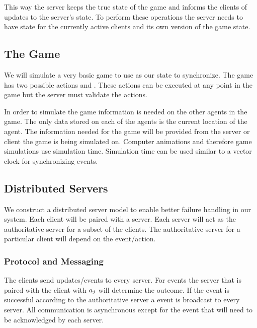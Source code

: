 	This way the server keeps the true state of the game and informs the clients of updates to the server's state. To perform these operations the server needs to have state for the currently active clients and its own version of the game state.

\subsection{The Game}

	We will simulate a very basic game to use as our state to synchronize. 
	The game has two possible actions \move{\agent}{\position} and . These actions can be executed at any point in the game but the server must validate the actions. 
	
	In order to simulate the game information is needed on the other agents in the game. The only data stored on each of the agents is the current location of the agent. The information needed for the game will be provided from the server or client the game is being simulated on. Computer animations and therefore game simulations use simulation time. Simulation time can be used similar to a vector clock for synchronizing events.

\subsection{Distributed Servers}
\label{subsec:distributed-servers}

	We construct a distributed server model to enable better failure handling in our system. Each client will be paired with a server. Each server will act as the authoritative server for a subset of the clients. The authoritative server for a particular client will depend on the event/action. 
	
	\subsubsection{Protocol and Messaging}
	
	The clients send updates/events to every server. For  events the server that is paired with the client with $a_{j}$ will determine the outcome. If the  event is successful according to the authoritative server a  event is broadcast to every server. All communication is asynchronous except for the  event that will need to be acknowledged by each server.

